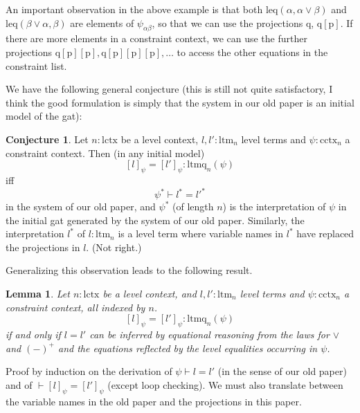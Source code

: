 \documentclass[11pt,a4paper]{article}
\newtheorem{lemma}{Lemma}[theorem]
\theoremstyle{definition}
\newtheorem{conjecture}{Conjecture}
\def\psiab{\psi_{\alpha\beta}}
\def\lctx{\mathrm{lctx}}
\def\ltm{\mathrm{ltm}}
\def\ltmq{\mathrm{ltmq}}
\def\leq{\mathrm{leq}}
\def\cctx{\mathrm{cctx}}
\def\p{\mathrm{p}}
\def\q{\mathrm{q}}
\begin{document}
An important observation in the above example is that
both $\leq(\alpha,\alpha\vee\beta)$ and $\leq(\beta\vee\alpha,\beta)$
are elements of $\psiab$, so that we can use the projections $\q$, $\q[\p]$. If there
are more elements in a constraint context, we can use the further projections $\q[\p][\p], \q[\p][\p][\p], \ldots$
to access the other equations in the constraint list.

We have the following general conjecture (this is still not quite satisfactory, I think the good formulation is simply that the system in our old paper is an initial model of the gat):
\begin{conjecture}\label{conj:cctx-entails-lattice-eqs}
Let $n:\lctx$ be a level context, $l,l':\ltm_n$ level terms and 
$\psi:\cctx_n$ a constraint context. Then (in any initial model)
$$
[l]_\psi = [l']_\psi  : \ltmq_n(\psi)
$$
iff
$$
\psi^* \vdash l^* = l'^*
$$
in the system of our old paper, and $\psi^*$ (of length $n$) is the interpretation of $\psi$ in the initial gat generated by the system of our old paper. Similarly, the interpretation $l^*$ of $l : \ltm_n$ is a level term where variable names in $l^*$ have replaced the projections in $l$. (Not right.)
\end{conjecture}

Generalizing this observation leads to the following result.

\begin{lemma}\label{lem:cctx-entails-lattice-eqs}
Let $n:\lctx$ be a level context, and $l,l':\ltm_n$ level terms and 
$\psi:\cctx_n$ a constraint context, all indexed by $n$.
$$
[l]_\psi = [l']_\psi  : \ltmq_n(\psi)
$$
if and only if $l=l'$ can be inferred by equational reasoning from the laws for $\vee$ and $(-)^+$ and the equations reflected by the level
equalities occurring in $\psi$. 

\end{lemma}

Proof by induction on the derivation of $\psi \vdash l = l'$ (in the sense of our old paper) and of $\vdash [l]_\psi  = [l']_\psi $ (except loop checking).
We must also translate between the variable names in the old paper and the projections in this paper.
\end{document}
